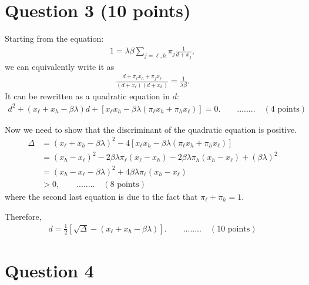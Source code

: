 \documentclass[12pt]{article}
\begin{document}
\newpage
\section*{Question 3 (10 points)}
Starting from the equation:
\begin{align*}
    1 = \lambda \beta \sum_{j = \ell, h} \pi_j \frac{1}{d+x_j},
\end{align*}
we can equivalently write it as
\begin{align*}
    \frac{d + \pi_\ell x_h + \pi_j x_\ell}{(d+x_\ell)(d+x_h)} = \frac{1}{\lambda \beta}.
\end{align*}
It can be rewritten as a quadratic equation in $d$:
\begin{align*}
    d^2 + (x_\ell + x_h - \beta \lambda)d + [x_\ell x_h - \beta \lambda(\pi_\ell x_h + \pi_h x_\ell)] = 0. \qquad ........ \quad(4 \text{ points})
\end{align*}

Now we need to show that the discriminant of the quadratic equation is positive.
\begin{align*}
    \Delta &= (x_\ell + x_h - \beta \lambda)^2 - 4[x_\ell x_h - \beta \lambda(\pi_\ell x_h + \pi_h x_\ell)]\\
    &= (x_h - x_\ell)^2 - 2 \beta \lambda \pi_\ell (x_\ell - x_h) - 2 \beta \lambda \pi_h(x_h - x_\ell) + (\beta \lambda)^2\\
    &= (x_h - x_\ell - \beta\lambda)^2 + 4 \beta \lambda \pi_\ell (x_h - x_\ell)\\
    & > 0, \qquad ........ \quad(8 \text{ points})
\end{align*}
where the second last equation is due to the fact that $\pi_\ell + \pi_h = 1$.

Therefore, 
\begin{align*}
    d = \frac{1}{2} [\sqrt{\Delta} - (x_\ell + x_h - \beta \lambda)]. \qquad ........ \quad(10 \text{ points})
\end{align*}

\newpage
\section*{Question 4}
\end{document}
